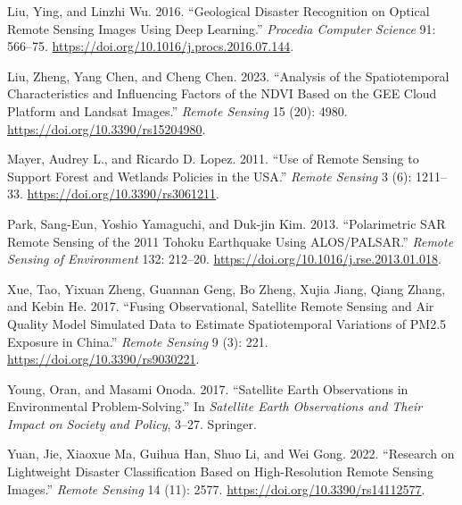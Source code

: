 \documentclass[
  letterpaper,
]{scrbook}
\newlength{\cslhangindent}
\newenvironment{CSLReferences}[2] %
 {\begin{list}{}{%
  \setlength{\itemindent}{0pt}
  \setlength{\leftmargin}{0pt}
  \setlength{\parsep}{0pt}
  \ifodd #1
   \setlength{\leftmargin}{\cslhangindent}
   \setlength{\itemindent}{-1\cslhangindent}
  \fi
  \setlength{\itemsep}{#2\baselineskip}}}
 {\end{list}}
\begin{document}
\begin{CSLReferences}{1}{0}
Liu, Ying, and Linzhi Wu. 2016. {``Geological Disaster Recognition on
Optical Remote Sensing Images Using Deep Learning.''} \emph{Procedia
Computer Science} 91: 566--75.
\url{https://doi.org/10.1016/j.procs.2016.07.144}.

Liu, Zheng, Yang Chen, and Cheng Chen. 2023. {``Analysis of the
Spatiotemporal Characteristics and Influencing Factors of the {NDVI}
Based on the {GEE} Cloud Platform and {Landsat} Images.''} \emph{Remote
Sensing} 15 (20): 4980. \url{https://doi.org/10.3390/rs15204980}.

Mayer, Audrey L., and Ricardo D. Lopez. 2011. {``Use of Remote Sensing
to Support Forest and Wetlands Policies in the {USA}.''} \emph{Remote
Sensing} 3 (6): 1211--33. \url{https://doi.org/10.3390/rs3061211}.

Park, Sang-Eun, Yoshio Yamaguchi, and Duk-jin Kim. 2013. {``Polarimetric
SAR Remote Sensing of the 2011 Tohoku Earthquake Using ALOS/PALSAR.''}
\emph{Remote Sensing of Environment} 132: 212--20.
\url{https://doi.org/10.1016/j.rse.2013.01.018}.

Xue, Tao, Yixuan Zheng, Guannan Geng, Bo Zheng, Xujia Jiang, Qiang
Zhang, and Kebin He. 2017. {``Fusing Observational, Satellite Remote
Sensing and Air Quality Model Simulated Data to Estimate Spatiotemporal
Variations of {PM2}.5 Exposure in {China}.''} \emph{Remote Sensing} 9
(3): 221. \url{https://doi.org/10.3390/rs9030221}.

Young, Oran, and Masami Onoda. 2017. {``Satellite Earth Observations in
Environmental Problem-Solving.''} In \emph{Satellite Earth Observations
and Their Impact on Society and Policy}, 3--27. Springer.

Yuan, Jie, Xiaoxue Ma, Guihua Han, Shuo Li, and Wei Gong. 2022.
{``Research on Lightweight Disaster Classification Based on
High-Resolution Remote Sensing Images.''} \emph{Remote Sensing} 14 (11):
2577. \url{https://doi.org/10.3390/rs14112577}.

\end{CSLReferences}


\backmatter
\end{document}
